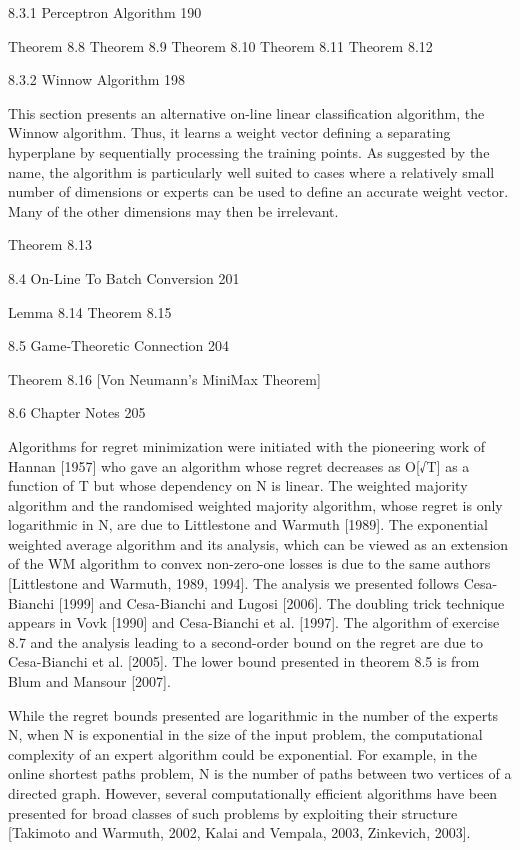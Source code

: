 8.3.1 Perceptron Algorithm 190

Theorem 8.8
Theorem 8.9
Theorem 8.10
Theorem 8.11
Theorem 8.12

8.3.2 Winnow Algorithm 198

This section presents an alternative on-line linear classification algorithm, the Winnow algorithm. Thus, it learns a weight vector defining a separating hyperplane by sequentially processing the training points. As suggested by the name, the algorithm is particularly well suited to cases where a relatively small number of dimensions or experts can be used to define an accurate weight vector. Many of the other dimensions may then be irrelevant.

Theorem 8.13

8.4 On-Line To Batch Conversion 201

Lemma 8.14
Theorem 8.15

8.5 Game-Theoretic Connection 204

Theorem 8.16 [Von Neumann's MiniMax Theorem]

8.6 Chapter Notes 205

Algorithms for regret minimization were initiated with the pioneering work of Hannan [1957] who gave an algorithm whose regret decreases as O[√T] as a function of T but whose dependency on N is linear. The weighted majority algorithm and the randomised weighted majority algorithm, whose regret is only logarithmic in N, are due to Littlestone and Warmuth [1989]. The exponential weighted average algorithm and its analysis, which can be viewed as an extension of the WM algorithm to convex non-zero-one losses is due to the same authors [Littlestone and Warmuth, 1989, 1994]. The analysis we presented follows Cesa-Bianchi [1999] and Cesa-Bianchi and Lugosi [2006]. The doubling trick technique appears in Vovk [1990] and Cesa-Bianchi et al. [1997]. The algorithm of exercise 8.7 and the analysis leading to a second-order bound on the regret are due to Cesa-Bianchi et al. [2005]. The lower bound presented in theorem 8.5 is from Blum and Mansour [2007].

While the regret bounds presented are logarithmic in the number of the experts N, when N is exponential in the size of the input problem, the computational complexity of an expert algorithm could be exponential. For example, in the online shortest paths problem, N is the number of paths between two vertices of a directed graph. However, several computationally efficient algorithms have been presented for broad classes of such problems by exploiting their structure [Takimoto and Warmuth, 2002, Kalai and Vempala, 2003, Zinkevich, 2003].

